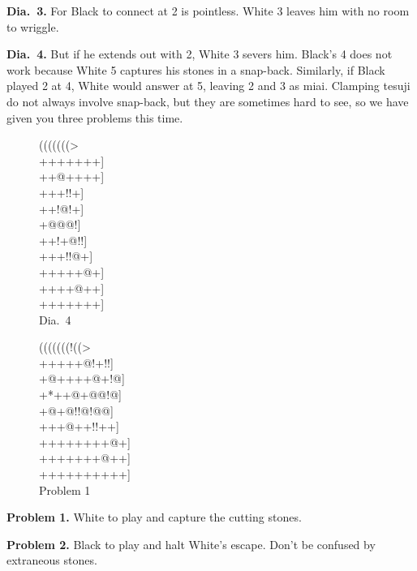 \documentclass[royalvopaper,10pt,twoside,onecolumn,draft]{memoir}
\begin{document}
\noindent
\textbf{Dia.\ 3.} For Black to connect at 2 is pointless. White 3 leaves him with
no room to wriggle.

\noindent
\textbf{Dia.\ 4.} But if he extends out with 2, White 3 severs him. Black's 4 does
not work because White 5 captures his stones in a snap-back. Similarly,
if Black played 2 at 4, White would answer at 5, leaving 2 and 3 as miai.
Clamping tesuji do not always involve snap-back, but they are sometimes
hard to see, so we have given you three problems this time.

\begin{figure}[ht]
    \begin{minipage}[c]{0.50\linewidth}
        \centering    
        {\gnos%
        (((((((>\\
        +++++++]\\
        ++@++++]\\
        +++{\gnosw{}}!!+]\\
        ++!{\gnosb{}}@!+]\\
        +{\gnosb{}}@{\gnosw{}}@@!]\\
        ++!+@!!]\\
        +++!!@+]\\
        +++++@+]\\
        ++++@++]\\
        +++++++]\\
        }
        Dia.\ 4
    \end{minipage}%
    \begin{minipage}[c]{0.50\linewidth}
        \centering    
        {\gnos%
        (((((((!((>\\
        +++++@!+!!]\\
        +@++++@+!@]\\
        +*++@+@@!@]\\
        +@+@!!@!@@]\\
        +++@++!!++]\\
        ++++++++@+]\\
        +++++++@++]\\
        ++++++++++]\\
        }
        Problem 1
    \end{minipage}%
\end{figure}

\noindent
\textbf{Problem 1.} White to play and capture the cutting stones.

\noindent
\textbf{Problem 2.} Black to play and halt White's escape. Don't be confused by
extraneous stones.
\end{document}
